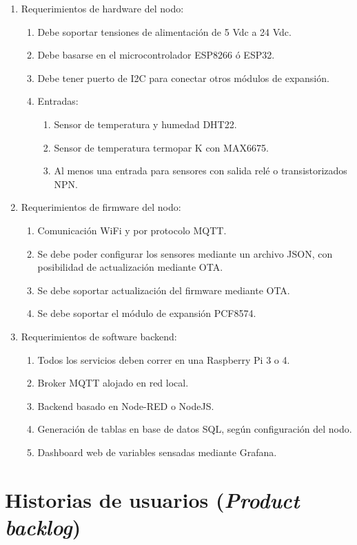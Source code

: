\documentclass[11pt]{charter}
\begin{document}
\begin{enumerate}
\item Requerimientos de hardware del nodo:
	\begin{enumerate}
	\item Debe soportar tensiones de alimentación de 5 Vdc a 24 Vdc.
	\item Debe basarse en el microcontrolador ESP8266 ó ESP32.
	\item Debe tener puerto de I2C para conectar otros módulos de expansión.
	\item Entradas:
		\begin{enumerate}
		\item Sensor de temperatura y humedad DHT22.
		\item Sensor de temperatura termopar K con MAX6675.
		\item Al menos una entrada para sensores con salida relé o transistorizados NPN.
		\end{enumerate}
	\end{enumerate}
\item Requerimientos de firmware del nodo:
	\begin{enumerate}
	\item Comunicación WiFi y por protocolo MQTT.
	\item Se debe poder configurar los sensores mediante un archivo JSON, con posibilidad de actualización mediante OTA.
	\item Se debe soportar actualización del firmware mediante OTA.
	\item Se debe soportar el módulo de expansión PCF8574.
	\end{enumerate}
\item Requerimientos de software backend:
	\begin{enumerate}
	\item Todos los servicios deben correr en una Raspberry Pi 3 o 4.
	\item Broker MQTT alojado en red local.
	\item Backend basado en Node-RED o NodeJS.
	\item Generación de tablas en base de datos SQL, según configuración del nodo.
	\item Dashboard web de variables sensadas mediante Grafana.
	\end{enumerate}
\end{enumerate}

\section{Historias de usuarios (\textit{Product backlog})}
\label{sec:backlog}
\end{document}
